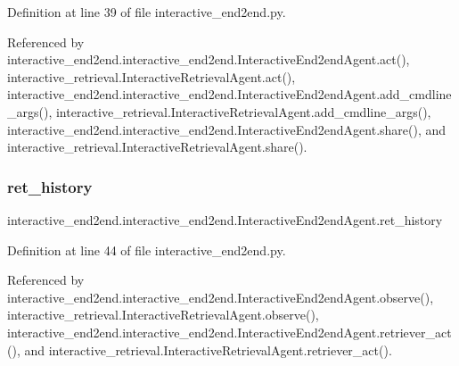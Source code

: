 Definition at line 39 of file interactive\+\_\+end2end.\+py.



Referenced by interactive\+\_\+end2end.\+interactive\+\_\+end2end.\+Interactive\+End2end\+Agent.\+act(), interactive\+\_\+retrieval.\+Interactive\+Retrieval\+Agent.\+act(), interactive\+\_\+end2end.\+interactive\+\_\+end2end.\+Interactive\+End2end\+Agent.\+add\+\_\+cmdline\+\_\+args(), interactive\+\_\+retrieval.\+Interactive\+Retrieval\+Agent.\+add\+\_\+cmdline\+\_\+args(), interactive\+\_\+end2end.\+interactive\+\_\+end2end.\+Interactive\+End2end\+Agent.\+share(), and interactive\+\_\+retrieval.\+Interactive\+Retrieval\+Agent.\+share().

\mbox{\label{classinteractive__end2end_1_1interactive__end2end_1_1InteractiveEnd2endAgent_a6fc3ebbeca880fd8d1706dc2b483fc16}} 
\subsubsection{\texorpdfstring{ret\+\_\+history}{ret\_history}}
{\footnotesize\ttfamily interactive\+\_\+end2end.\+interactive\+\_\+end2end.\+Interactive\+End2end\+Agent.\+ret\+\_\+history}



Definition at line 44 of file interactive\+\_\+end2end.\+py.



Referenced by interactive\+\_\+end2end.\+interactive\+\_\+end2end.\+Interactive\+End2end\+Agent.\+observe(), interactive\+\_\+retrieval.\+Interactive\+Retrieval\+Agent.\+observe(), interactive\+\_\+end2end.\+interactive\+\_\+end2end.\+Interactive\+End2end\+Agent.\+retriever\+\_\+act(), and interactive\+\_\+retrieval.\+Interactive\+Retrieval\+Agent.\+retriever\+\_\+act().

\mbox{\label{classinteractive__end2end_1_1interactive__end2end_1_1InteractiveEnd2endAgent_aaabc8b5dd597ab35435b91263a30644a}} 
